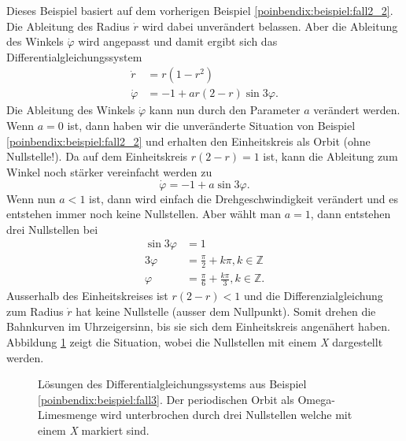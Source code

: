 \begin{beispiel} \label{poinbendix:beispiel:fall3}

Dieses Beispiel basiert auf dem vorherigen Beispiel \ref{poinbendix:beispiel:fall2_2}.
Die Ableitung des Radius $\dot{r}$ wird dabei unverändert belassen.
Aber die Ableitung des Winkels $\dot{\varphi}$ wird angepasst und damit ergibt sich das Differentialgleichungssystem
\begin{align*}
    \dot{r}       &= r(1-r^2) \\
    \dot{\varphi} &= -1 + ar(2-r) \sin 3\varphi.
\end{align*}
Die Ableitung des Winkels $\dot{\varphi}$ kann nun durch den Parameter $a$ verändert werden.
Wenn $a=0$ ist, dann haben wir die unveränderte Situation von Beispiel \ref{poinbendix:beispiel:fall2_2} und erhalten den Einheitskreis als Orbit (ohne Nullstelle!).
Da auf dem Einheitskreis $r(2-r)=1$ ist, kann die Ableitung zum Winkel noch stärker vereinfacht werden zu
\begin{equation*}
    \dot{\varphi} = -1 + a \sin 3\varphi.
\end{equation*}
Wenn nun $a<1$ ist, dann wird einfach die Drehgeschwindigkeit verändert und es entstehen immer noch keine Nullstellen.
Aber wählt man $a=1$, dann entstehen drei Nullstellen bei
\begin{align*}
    \sin 3\varphi &= 1 \\
    3\varphi &= \frac{\pi}{2} + k\pi, k \in \mathbb{Z} \\
    \varphi &= \frac{\pi}{6} + \frac{k\pi}{3}, k \in \mathbb{Z}.
\end{align*}
Ausserhalb des Einheitskreises ist $r(2-r)<1$ und die Differenzialgleichung zum Radius $\dot{r}$ hat keine Nullstelle (ausser dem Nullpunkt).
Somit drehen die Bahnkurven im Uhrzeigersinn, bis sie sich dem Einheitskreis angenähert haben.
Abbildung \ref{poinbendix:fig:fall_3} zeigt die Situation, wobei die Nullstellen mit einem \textit{X} dargestellt werden.
\end{beispiel}

\begin{figure}
\centering
    
    \caption{Lösungen des Differentialgleichungssystems aus Beispiel \ref{poinbendix:beispiel:fall3}.
    Der periodischen Orbit als Omega-Limesmenge wird unterbrochen durch drei Nullstellen welche mit einem \textit{X} markiert sind.}
\label{poinbendix:fig:fall_3}
\end{figure}
